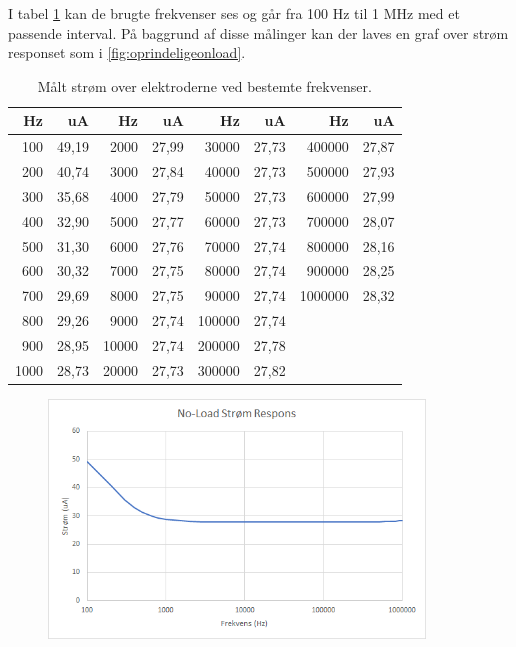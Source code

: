 I tabel \ref{table:frekvensernoload} kan de brugte frekvenser ses og går fra 100 Hz til 1 MHz med et passende interval. På baggrund af disse målinger kan der laves en graf over strøm responset som i \ref{fig:oprindeligeonload}.

\begin{table}[H]
\centering
\begin{tabular}{| r | r || r | r || r | r || r | r |}
    \hline
    \textbf{Hz} & \textbf{uA} & \textbf{Hz} & \textbf{uA} & \textbf{Hz} & \textbf{uA} & \textbf{Hz} & \textbf{uA}\\ \hline
    100 & 49,19 & 2000 & 27,99 & 30000 & 27,73 & 400000 & 27,87  \\ \hline
    200 & 40,74 & 3000 & 27,84 & 40000 & 27,73 & 500000 & 27,93  \\ \hline
    300 & 35,68 & 4000 & 27,79 & 50000 & 27,73 & 600000 & 27,99  \\ \hline
    400 & 32,90 & 5000 & 27,77 & 60000 & 27,73 & 700000 & 28,07  \\ \hline
    500 & 31,30 & 6000 & 27,76 & 70000 & 27,74 & 800000 & 28,16  \\ \hline
    600 & 30,32 & 7000 & 27,75 & 80000 & 27,74 & 900000 & 28,25  \\ \hline
    700 & 29,69 & 8000 & 27,75 & 90000 & 27,74 & 1000000 & 28,32  \\ \hline
    800 & 29,26 & 9000 & 27,74 & 100000 & 27,74 &  &   \\ \hline
    900 & 28,95 & 10000 & 27,74 & 200000 & 27,78 &  &   \\ \hline
    1000 & 28,73 & 20000 & 27,73 & 300000 & 27,82 &  &  \\ \hline
\end{tabular}
    \caption{Målt strøm over elektroderne ved bestemte frekvenser.}
    \label{table:frekvensernoload}
\end{table} 


\begin{figure}[H]
\centering
\includegraphics[width=10cm]{Figure/testopstilling1multisimnoloadgraf}
\label{fig:testopstilling1multisimnoloadgraf}
\end{figure}


